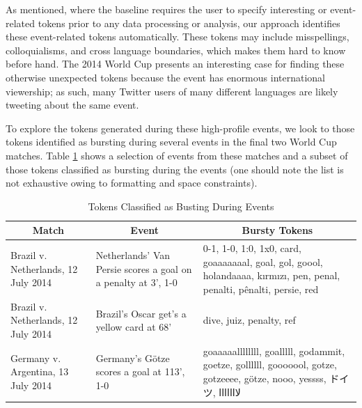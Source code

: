 \documentclass{acm_proc_article-sp}
\begin{document}
As mentioned, where the baseline requires the user to specify interesting or event-related tokens prior to any data processing or analysis, our approach identifies these event-related tokens automatically.
These tokens may include misspellings, colloquialisms, and cross language boundaries, which makes them hard to know before hand.
The 2014 World Cup presents an interesting case for finding these otherwise unexpected tokens because the event has enormous international viewership; as such, many Twitter users of many different languages are likely tweeting about the same event.

To explore the tokens generated during these high-profile events, we look to those tokens identified as bursting during several events in the final two World Cup matches.
Table \ref{tab:burstyTokens} shows a selection of events from these matches and a subset of those tokens classified as bursting during the events (one should note the list is not exhaustive owing to formatting and space constraints).

\begin{table}[htdp]
\caption{Tokens Classified as Busting During Events}
\begin{center}
\begin{tabular}{|p{0.75in}|p{0.7in}| p{1.45in} |}
\hline
\multicolumn{1}{|c|}{\textbf{Match}} & \multicolumn{1}{|c|}{\textbf{Event}} & \multicolumn{1}{|c|}{\textbf{Bursty Tokens}} \\ \hline
Brazil v. Netherlands, 12 July 2014 & Netherlands' Van Persie scores a goal on a penalty at 3', 1-0 & 0-1, 1-0, 1:0, 1x0, card, goaaaaaaal, goal, gol, goool, holandaaaa, k\i{}rm\i{}z\i{}, pen, penal, penalti, p\^{e}nalti, persie, red \\ \hline
Brazil v. Netherlands, 12 July 2014 & Brazil's Oscar get's a yellow card at 68' & dive, juiz, penalty, ref \\ \hline
Germany v. Argentina, 13 July 2014 & Germany's G\"{o}tze scores a goal at 113', 1-0 & goaaaaallllllll, goalllll, godammit, goetze, gollllll, gooooool, gotze, gotzeeee, g\"{o}tze, nooo, yessss, ドイツ, لااااااا \\ \hline
\end{tabular}
\end{center}
\label{tab:burstyTokens}
\end{table}
\end{document}
